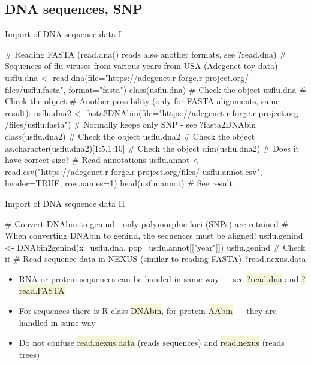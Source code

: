 \documentclass[compress, ucs, xelatex, 11pt, xcolor=svgnames, aspectratio=169,
	hyperref={
		bookmarks=true,
		unicode=true,
		colorlinks=true,
		pdftitle={Molecular data in R},
		plainpages=false,
		pdfauthor={Vojtech Zeisek},
		pdfsubject={Course about phylogeny and evolution in R},
		pdfcreator={XeLaTeX},
		pdfkeywords={R, evolution, phylogeny, molecular data},
		linkcolor=Crimson, %
		anchorcolor=Magenta, %
		citecolor=Magenta, %
		filecolor=Magenta, %
		menucolor=Magenta, %
		urlcolor=DodgerBlue, %
		pdftex},
	url={hyphens, lowtilde} %
	]{beamer}
\renewcommand{\texttt}[1]{\colorbox{Beige}{{\ttfamily #1}}}
\begin{document}
\subsection{DNA sequences, SNP}

\begin{frame}[fragile]{Import of DNA sequence data I}
	\begin{spluscode}
    # Reading FASTA (read.dna() reads also another formats, see ?read.dna)
    # Sequences of flu viruses from various years from USA (Adegenet toy data)
    usflu.dna <- read.dna(file="https://adegenet.r-forge.r-project.org/
      files/usflu.fasta", format="fasta")
    class(usflu.dna) # Check the object
    usflu.dna # Check the object
    # Another possibility (only for FASTA alignments, same result):
    usflu.dna2 <- fasta2DNAbin(file="https://adegenet.r-forge.r-project.org
      /files/usflu.fasta") # Normally keeps only SNP - see ?fasta2DNAbin
    class(usflu.dna2) # Check the object
    usflu.dna2 # Check the object
    as.character(usflu.dna2)[1:5,1:10] # Check the object
    dim(usflu.dna2) # Does it have correct size?
    # Read annotations
    usflu.annot <- read.csv("https://adegenet.r-forge.r-project.org/files/
      usflu.annot.csv", header=TRUE, row.names=1)
    head(usflu.annot) # See result
	\end{spluscode}
\end{frame}

\begin{frame}[fragile]{Import of DNA sequence data II}
	\begin{spluscode}
    # Convert DNAbin to genind - only polymorphic loci (SNPs) are retained
    # When converting DNAbin to genind, the sequences must be aligned!
    usflu.genind <- DNAbin2genind(x=usflu.dna, pop=usflu.annot[["year"]])
    usflu.genind # Check it
    # Read sequence data in NEXUS (similar to reading FASTA)
    ?read.nexus.data
	\end{spluscode}
	\begin{itemize}
		\item RNA or protein sequences can be handed in same way --- see \texttt{?read.dna} and \texttt{?read.FASTA}
		\item For sequences there is R class \texttt{DNAbin}, for protein \texttt{AAbin} --- they are handled in same way
		\item Do not confuse \texttt{read.nexus.data} (reads sequences) and \texttt{read.nexus} (reads trees)
	\end{itemize}
\end{frame}
\end{document}
